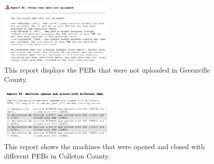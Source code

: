 \begin{figure}[h!]
  \caption{This report displays the PEBs that were not uploaded in Greenville County.}
  \label{fig:sample2}
  \centering
    \includegraphics[width=0.5\textwidth]{sample3}
\end{figure}

\begin{figure}[h!]
  \caption{This report shows the machines that were opened and closed with different PEBs in Colleton County.}
  \label{fig:sample3}
  \centering
    \includegraphics[width=0.5\textwidth]{sample2}
\end{figure}